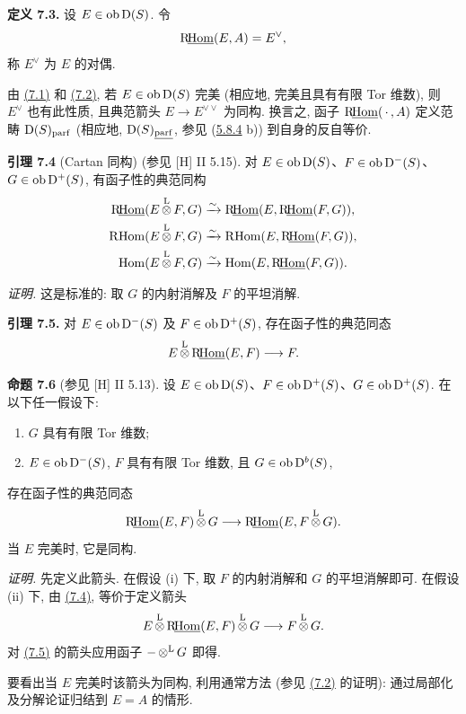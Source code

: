 \textbf{定义 7.3.} 设 \(E\in\Ob\Dpx(S)\). 令
\[
  \sgaIRHom(E,A)=E^\vee,
\]
称 \(E^\vee\) 为 \(E\) 的对偶.

由 \hyperlink{sga6.e01.prop.7-1}{(7.1)} 和 \hyperlink{sga6.e01.prop.7-2}{(7.2)}, 若 \(E\in\Ob\Dpx(S)\) 完美 (相应地, 完美且具有有限 Tor 维数), 则 \(E^\vee\) 也有此性质, 且典范箭头 \(E\to E^{\vee\vee}\) 为同构. 换言之, 函子 \(\sgaIRHom(\,\cdot\,,A)\) 定义范畴 \(\Dpx(S)_{\mathrm{parf}}\) (相应地, \(\Dpx(S)_{\sgaIParff}\), 参见 (\hyperlink{sga6.e01.rem.5-8-4}{5.8.4} b)) 到自身的反自等价.

\textbf{引理 7.4} (Cartan 同构) (参见 [H] II 5.15). 对 \(E\in\Ob\Dpx(S)\)、\(F\in\Ob\Dpx^-(S)\)、\(G\in\Ob\Dpx^+(S)\), 有函子性的典范同构
\[
\begin{aligned}
\sgaIRHom(E\otL F,G)&\xrightarrow{\sim}\sgaIRHom(E,\sgaIRHom(F,G)),\\
\sgaIGRHom(E\otL F,G)&\xrightarrow{\sim}\sgaIGRHom(E,\sgaIRHom(F,G)),\\
\Hom(E\otL F,G)&\xrightarrow{\sim}\Hom(E,\sgaIRHom(F,G)).
\end{aligned}
\]

\emph{证明.} 这是标准的: 取 \(G\) 的内射消解及 \(F\) 的平坦消解.

\textbf{引理 7.5.} 对 \(E\in\Ob\Dpx^-(S)\) 及 \(F\in\Ob\Dpx^+(S)\), 存在函子性的典范同态
\[
  E\otL \sgaIRHom(E,F)\longrightarrow F.
\]

\textbf{命题 7.6} (参见 [H] II 5.13). 设 \(E\in\Ob\Dpx(S)\)、\(F\in\Ob\Dpx^+(S)\)、\(G\in\Ob\Dpx^+(S)\). 在以下任一假设下:
\begin{enumerate}[label=(\roman*)]
\item \(G\) 具有有限 Tor 维数;
\item \(E\in\Ob\Dpx^-(S)\), \(F\) 具有有限 Tor 维数, 且 \(G\in\Ob\Dpx^b(S)\),
\end{enumerate}
存在函子性的典范同态
\[
  \sgaIRHom(E,F)\otL G
  \longrightarrow
  \sgaIRHom(E,F\otL G).
\]
当 \(E\) 完美时, 它是同构.

\emph{证明.} 先定义此箭头. 在假设 (i) 下, 取 \(F\) 的内射消解和 \(G\) 的平坦消解即可. 在假设 (ii) 下, 由 \hyperlink{sga6.e01.lem.7-4}{(7.4)}, 等价于定义箭头
\[
  E\otL\sgaIRHom(E,F)\otL G\longrightarrow F\otL G.
\]
对 \hyperlink{sga6.e01.lem.7-5}{(7.5)} 的箭头应用函子 \(-\otL G\) 即得.

要看出当 \(E\) 完美时该箭头为同构, 利用通常方法 (参见 \hyperlink{sga6.e01.prop.7-2}{(7.2)} 的证明): 通过局部化及分解论证归结到 \(E=A\) 的情形.

